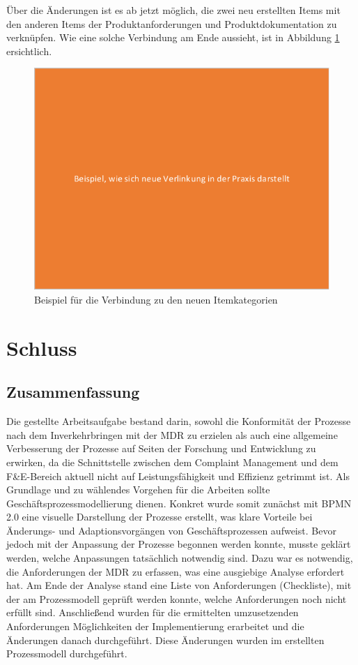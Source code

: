 \documentclass[a4paper,12pt]{report}
\begin{document}
Über die Änderungen ist es ab jetzt möglich, die zwei neu erstellten Items mit den anderen Items der Produktanforderungen und Produktdokumentation zu verknüpfen. Wie eine solche Verbindung am Ende aussieht, ist in Abbildung \ref{example_for_new_items} ersichtlich.
\begin{figure}[ht]
\centering
\includegraphics[width=1\textwidth]{Images/example_for_new_items}
\caption[Beispiel für die Verbindung zu den neuen Itemkategorien]{Beispiel für die Verbindung zu den neuen Itemkategorien}
\label{example_for_new_items}
\end{figure}
\chapter{Schluss}
\section{Zusammenfassung}\label{sec:Zusammenfassung}
Die gestellte Arbeitsaufgabe bestand darin, sowohl die Konformität der Prozesse nach dem Inverkehrbringen mit der MDR zu erzielen als auch eine allgemeine Verbesserung der Prozesse auf Seiten der Forschung und Entwicklung zu erwirken, da die Schnittstelle zwischen dem Complaint Management und dem F\&E-Bereich aktuell nicht auf Leistungsfähigkeit und Effizienz getrimmt ist. Als Grundlage und zu wählendes Vorgehen für die Arbeiten sollte Geschäftsprozessmodellierung dienen. Konkret wurde somit zunächst mit BPMN 2.0 eine visuelle Darstellung der Prozesse erstellt, was klare Vorteile bei Änderungs- und Adaptionsvorgängen von Geschäftsprozessen aufweist. Bevor jedoch mit der Anpassung der Prozesse begonnen werden konnte, musste geklärt werden, welche Anpassungen tatsächlich notwendig sind. Dazu war es notwendig, die Anforderungen der MDR zu erfassen, was eine ausgiebige Analyse erfordert hat. Am Ende der Analyse stand eine Liste von Anforderungen (Checkliste), mit der am Prozessmodell geprüft werden konnte, welche Anforderungen noch nicht erfüllt sind. Anschließend wurden für die ermittelten umzusetzenden Anforderungen Möglichkeiten der Implementierung erarbeitet und die Änderungen danach durchgeführt. Diese Änderungen wurden im erstellten Prozessmodell durchgeführt.
\end{document}
